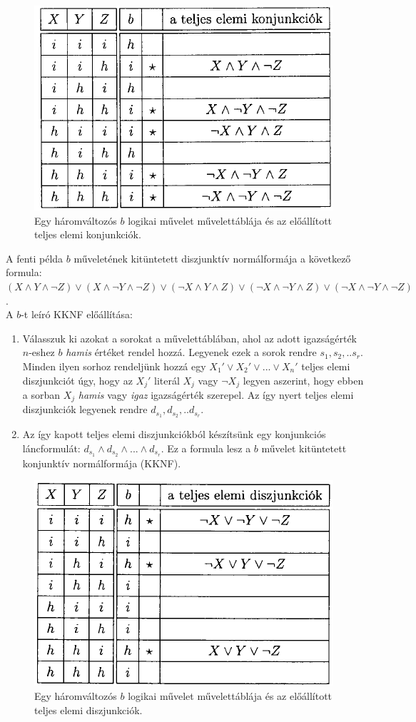 \documentclass[margin=0px]{article}
\begin{document}
	\begin{figure}[H]
		\centering
		\includegraphics[width=0.5\linewidth]{img/kdnf_pelda}
		\caption{Egy háromváltozós $b$ logikai művelet művelettáblája és az előállított teljes elemi konjunkciók.}
		\label{fig:kdnf_pelda}
	\end{figure}
	
	A fenti példa $b$ műveletének kitüntetett diszjunktív normálformája a következő formula:\\
	$(X \wedge Y \wedge \neg Z) \vee (X \wedge \neg Y \wedge \neg Z) \vee (\neg X \wedge Y \wedge Z) \vee (\neg X \wedge \neg Y \wedge Z) \vee (\neg X \wedge \neg Y \wedge \neg Z)$.\\
	
	\noindent A $b$-t leíró KKNF előállítása:
	
	\begin{enumerate}
		\item	Válasszuk ki azokat a sorokat a művelettáblában, ahol az adott igazságérték $n$-eshez $b$ \textit{hamis}
		értéket rendel hozzá. Legyenek ezek a sorok rendre $s_{1}, s_{2}, .. s_{r}$. Minden ilyen sorhoz rendeljünk
		hozzá egy $X_{1}' \vee X_{2}' \vee ... \vee X_{n}'$ teljes elemi diszjunkciót úgy, hogy az $X_{j}'$ literál
		$X_{j}$ vagy $\neg X_{j}$ legyen aszerint, hogy ebben a sorban $X_{j}$ \textit{hamis} vagy \textit{igaz} igazságérték
		szerepel. Az így nyert teljes elemi diszjunkciók legyenek rendre $d_{s_{1}}, d_{s_{2}}, .. d_{s_{r}}$.
		
		\item	Az így kapott teljes elemi diszjunkciókból készítsünk egy konjunkciós láncformulát:
		$d_{s_{1}} \wedge d_{s_{2}} \wedge ... \wedge d_{s_{r}}$. Ez a formula lesz a $b$ művelet kitüntetett konjunktív
		normálformája (KKNF).
	\end{enumerate}
	
	\begin{figure}[H]
		\centering
		\includegraphics[width=0.5\linewidth]{img/kknf_pelda}
		\caption{Egy háromváltozós $b$ logikai művelet művelettáblája és az előállított teljes elemi diszjunkciók.}
		\label{fig:kknf_pelda}
	\end{figure}
	
\end{document}
